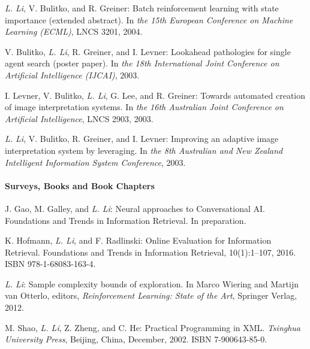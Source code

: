 \documentclass[10pt,twoside,letterpaper]{article}
\newcommand{\selffont}[1]{{\textit{#1}}}
\newcommand{\venuefont}[1]{{\textit{#1}}}
\newcommand{\negitemspace}{\vspace{1mm}}
\newcommand{\myself}{\selffont{L. Li}}
\begin{document}
\begin{compactenum}[(C1)]
\item{\myself, V. Bulitko, and R. Greiner: Batch reinforcement learning with state importance (extended abstract).  In \venuefont{the 15th European Conference on Machine Learning (ECML)}, LNCS 3201, 2004.}

\item{V. Bulitko, \myself, R. Greiner, and I. Levner: Lookahead pathologies for single agent search (poster paper). In \venuefont{the 18th International Joint Conference on Artificial Intelligence (IJCAI)}, 2003.}

\item{I. Levner, V. Bulitko, \myself, G. Lee, and R. Greiner: Towards automated creation of image interpretation systems. In \venuefont{the 16th Australian Joint Conference on Artificial
Intelligence}, LNCS 2903, 2003.}

\item{\myself, V. Bulitko, R. Greiner, and I. Levner: Improving an adaptive image interpretation system by leveraging. In \venuefont{the 8th Australian and New Zealand Intelligent Information System Conference}, 2003.}

\end{compactenum} \negitemspace

\paragraph{Surveys, Books and Book Chapters} \negitemspace

\begin{compactenum}[(B1)]

\item{J. Gao, M. Galley, and \myself: Neural approaches to
Conversational AI.  Foundations and Trends in Information Retrieval.  In preparation.}

\item{K. Hofmann, \myself, and F. Radlinski: Online Evaluation for Information Retrieval.  Foundations and Trends in Information Retrieval, 10(1):1--107, 2016. ISBN 978-1-68083-163-4.}

\item{\myself: Sample complexity bounds of exploration.  In Marco Wiering and Martijn van Otterlo, editors, \venuefont{Reinforcement Learning: State of the Art}, Springer Verlag, 2012.}

\item{M. Shao, \myself, Z. Zheng, and C. He: Practical
Programming in XML. \venuefont{Tsinghua University Press}, Beijing,
China, December, 2002. ISBN 7-900643-85-0.}

\end{compactenum} \negitemspace
\end{document}
